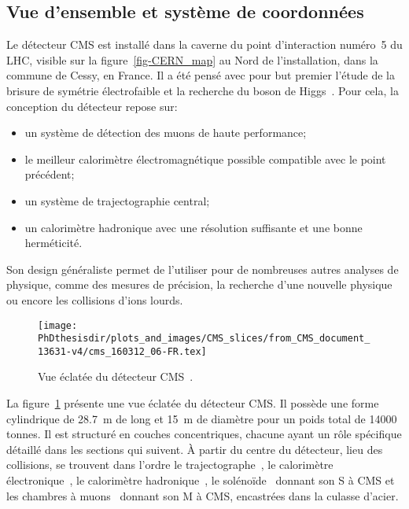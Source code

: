\subsection{Vue d'ensemble et système de coordonnées}\label{chapter-LHC-section-CMS-subsec-overview_and_coordinates}
Le détecteur CMS est installé dans la caverne du point d'interaction numéro~5 du LHC, visible sur la figure~\ref{fig-CERN_map} au Nord de l'installation, dans la commune de Cessy, en France.
Il a été pensé avec pour but premier l'étude de la brisure de symétrie électrofaible et la recherche du boson de Higgs~\cite{cms_letter_intent}.
Pour cela, la conception du détecteur repose sur:
\begin{itemize}
\item un système de détection des muons de haute performance;
\item le meilleur calorimètre électromagnétique possible compatible avec le point précédent;
\item un système de trajectographie central;
\item un calorimètre hadronique avec une résolution suffisante et une bonne herméticité.
\end{itemize}
Son design généraliste permet de l'utiliser pour de nombreuses autres analyses de physique, comme des mesures de précision, la recherche d'une nouvelle physique ou encore les collisions d'ions lourds.
\begin{figure}[b]
\centering
\texttt{[image: \\PhDthesisdir/plots\_and\_images/CMS\_slices/from\_CMS\_document\_13631-v4/cms\_160312\_06-FR.tex]}
\caption[Vue éclatée du détecteur CMS.]{Vue éclatée du détecteur CMS~\cite{CMS_document_13631-v4}.}
\label{fig-chapter-LHC-section-CMS-subsec-overview_and_coordinates-vue_eclatee_CMS}
\end{figure}
\par La figure~\ref{fig-chapter-LHC-section-CMS-subsec-overview_and_coordinates-vue_eclatee_CMS} présente une vue éclatée du détecteur CMS.
Il possède une forme cylindrique de \SI{28.7}{\meter} de long et \SI{15}{\meter} de diamètre pour un poids total de \num{14000} tonnes.
Il est structuré en couches concentriques, chacune ayant un rôle spécifique détaillé dans les sections qui suivent.
À partir du centre du détecteur, lieu des collisions, se trouvent dans l'ordre
le trajectographe~\cite{CERN-LHCC-98-006},
le calorimètre électronique~\cite{CERN-LHCC-97-033},
le calorimètre hadronique~\cite{CERN-LHCC-97-031},
le solénoïde~\cite{CERN-LHCC-97-010} donnant son \og S \fg{} à CMS et
les chambres à muons~\cite{CERN-LHCC-97-032} donnant son \og M \fg{} à CMS, encastrées dans la culasse d'acier.
